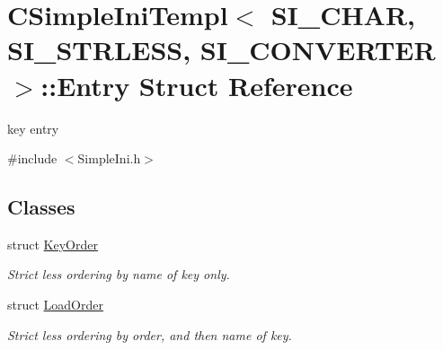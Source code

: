 \hypertarget{struct_c_simple_ini_templ_1_1_entry}{}\section{C\+Simple\+Ini\+Templ$<$ S\+I\+\_\+\+C\+H\+AR, S\+I\+\_\+\+S\+T\+R\+L\+E\+SS, S\+I\+\_\+\+C\+O\+N\+V\+E\+R\+T\+ER $>$\+:\+:Entry Struct Reference}
\label{struct_c_simple_ini_templ_1_1_entry}


key entry  




{\ttfamily \#include $<$Simple\+Ini.\+h$>$}

\subsection*{Classes}
\begin{DoxyCompactItemize}
\item 
struct \hyperlink{struct_c_simple_ini_templ_1_1_entry_1_1_key_order}{Key\+Order}
\begin{DoxyCompactList}\small\item\em Strict less ordering by name of key only. \end{DoxyCompactList}\item 
struct \hyperlink{struct_c_simple_ini_templ_1_1_entry_1_1_load_order}{Load\+Order}
\begin{DoxyCompactList}\small\item\em Strict less ordering by order, and then name of key. \end{DoxyCompactList}\end{DoxyCompactItemize}
